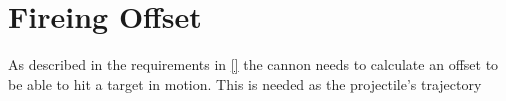 \section{Fireing Offset}
As described in the requirements in \autoref{} the cannon needs to calculate an
offset to be able to hit a target in motion. This is needed as the projectile's
trajectory 
